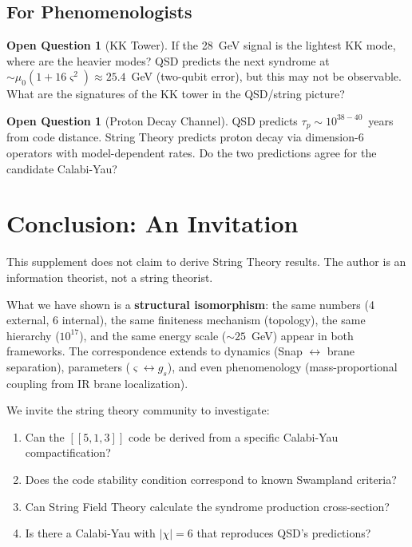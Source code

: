 \documentclass[11pt,a4paper]{article}
\theoremstyle{definition}
\newtheorem{question}[theorem]{Open Question}
\newcommand{\strain}{\varsigma}            %
\newcommand{\murad}{\mu_0}
\newcommand{\gs}{g_s}
\begin{document}
\subsection{For Phenomenologists}

\begin{question}[KK Tower]
If the 28~GeV signal is the lightest KK mode, where are the heavier modes?
QSD predicts the next syndrome at $\sim\murad(1 + 16\strain^2) \approx
25.4$~GeV (two-qubit error), but this may not be observable.  What are the
signatures of the KK tower in the QSD/string picture?
\end{question}

\begin{question}[Proton Decay Channel]
QSD predicts $\tau_p \sim 10^{38-40}$~years from code distance.  String
Theory predicts proton decay via dimension-6 operators with
model-dependent rates.  Do the two predictions agree for the candidate
Calabi-Yau?
\end{question}


\section{Conclusion: An Invitation}
\label{sec:conclusion}

This supplement does not claim to derive String Theory results.  The
author is an information theorist, not a string theorist.

What we have shown is a \textbf{structural isomorphism}: the same numbers
(4 external, 6 internal), the same finiteness mechanism (topology), the
same hierarchy ($10^{17}$), and the same energy scale ($\sim25$~GeV)
appear in both frameworks.  The correspondence extends to dynamics (Snap
$\leftrightarrow$ brane separation), parameters ($\strain \leftrightarrow
\gs$), and even phenomenology (mass-proportional coupling from IR brane
localization).

We invite the string theory community to investigate:
\begin{enumerate}
    \item Can the $[[5,1,3]]$ code be derived from a specific Calabi-Yau
          compactification?
    \item Does the code stability condition correspond to known Swampland
          criteria?
    \item Can String Field Theory calculate the syndrome production
          cross-section?
    \item Is there a Calabi-Yau with $|\chi| = 6$ that reproduces QSD's
          predictions?
\end{enumerate}
\end{document}
